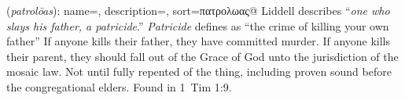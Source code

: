 \item[Father-murderer,]

(\textit{patrolōas}):
{
    name=,
    description={},
    sort=πατρολωας@
}
Liddell describes ``\emph{one who slays his father, a patricide}.'' \emph{Patricide} defines as ``the crime of killing your own father'' If anyone kills their father, they have committed murder. If anyone kills their parent, they should fall out of the Grace of God unto the jurisdiction of the mosaic law. Not until fully repented of the thing, including proven sound before the congregational elders.
Found in 1~Tim 1:9.
